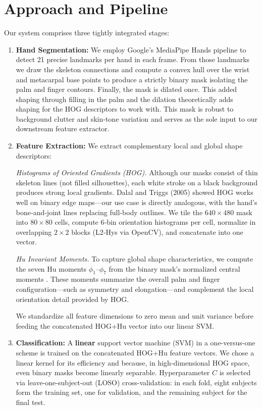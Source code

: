 \documentclass{article}
\begin{document}
\section{Approach and Pipeline}

Our system comprises three tightly integrated stages:

\begin{enumerate}
  \item \textbf{Hand Segmentation:}  
    We employ Google’s MediaPipe Hands pipeline to detect 21 precise landmarks per hand in each frame.  From those landmarks we draw the skeleton connections and compute a convex hull over the wrist and metacarpal base points to produce a strictly binary mask isolating the palm and finger contours.  Finally, the mask is dilated once. This added shaping through filling in the palm and the dilation theoretically adds shaping for the HOG descriptors to work with. This mask is robust to background clutter and skin‐tone variation and serves as the sole input to our downstream feature extractor.

    \item \textbf{Feature Extraction:}  
    We extract complementary local and global shape descriptors:

    \emph{Histograms of Oriented Gradients (HOG).}  
    Although our masks consist of thin skeleton lines (not filled silhouettes), each white stroke on a black background produces strong local gradients.  Dalal and Triggs (2005) showed HOG works well on binary edge maps—our use case is directly analogous, with the hand’s bone‐and‐joint lines replacing full‐body outlines.  We tile the \(640\times480\) mask into \(80\times80\) cells, compute 6‑bin orientation histograms per cell, normalize in overlapping \(2\times2\) blocks (L2‑Hys via OpenCV), and concatenate into one vector.    

    \emph{Hu Invariant Moments.}  
    To capture global shape characteristics, we compute the seven Hu moments \(\phi_1\)–\(\phi_7\) from the binary mask’s normalized central moments \cite{Hu1962}.  These moments summarize the overall palm and finger configuration—such as symmetry and elongation—and complement the local orientation detail provided by HOG.

    We standardize all feature dimensions to zero mean and unit variance before feeding the concatenated HOG+Hu vector into our linear SVM.

  \item \textbf{Classification:}  
    A \textbf{linear} support vector machine (SVM) in a one-versus-one scheme is trained on the concatenated HOG+Hu feature vectors.  We chose a linear kernel for its efficiency and because, in high-dimensional HOG space, even binary masks become linearly separable.  Hyperparameter \(C\) is selected via leave-one-subject-out (LOSO) cross-validation: in each fold, eight subjects form the training set, one for validation, and the remaining subject for the final test.  
\end{enumerate}
\end{document}
